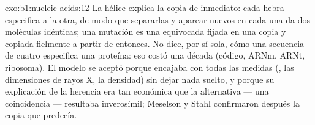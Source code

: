 \begin{solution}{exo:b1:nucleic-acids:12}
La hélice explica la copia de inmediato: cada hebra especifica a la otra, de
modo que separarlas y aparear  nuevos en cada una da dos
moléculas idénticas; una mutación es una  equivocada fijada en una copia
y copiada fielmente a partir de entonces. No dice, por sí sola, cómo una
secuencia de cuatro  especifica una proteína: eso costó una década
(código, ARNm, ARNt, ribosoma). El modelo se aceptó porque encajaba con
todas las medidas (, las dimensiones de rayos X, la densidad) sin
dejar nada suelto, y porque su explicación de la herencia era tan económica
que la alternativa --- una coincidencia --- resultaba inverosímil; Meselson
y Stahl confirmaron después la copia que predecía.
\end{solution}

